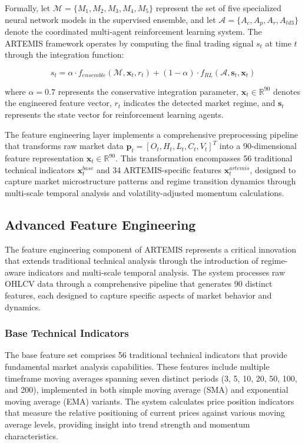 \documentclass[10pt,twocolumn]{article}
\begin{document}
Formally, let $\mathcal{M} = \{M_1, M_2, M_3, M_4, M_5\}$ represent the set of five specialized neural network models in the supervised ensemble, and let $\mathcal{A} = \{A_c, A_p, A_r, A_{td3}\}$ denote the coordinated multi-agent reinforcement learning system. The ARTEMIS framework operates by computing the final trading signal $s_t$ at time $t$ through the integration function:

\begin{equation}
s_t = \alpha \cdot f_{ensemble}(\mathcal{M}, \mathbf{x}_t, r_t) + (1-\alpha) \cdot f_{RL}(\mathcal{A}, \mathbf{s}_t, \mathbf{x}_t)
\end{equation}

where $\alpha = 0.7$ represents the conservative integration parameter, $\mathbf{x}_t \in \mathbb{R}^{90}$ denotes the engineered feature vector, $r_t$ indicates the detected market regime, and $\mathbf{s}_t$ represents the state vector for reinforcement learning agents.

The feature engineering layer implements a comprehensive preprocessing pipeline that transforms raw market data $\mathbf{p}_t = [O_t, H_t, L_t, C_t, V_t]^T$ into a 90-dimensional feature representation $\mathbf{x}_t \in \mathbb{R}^{90}$. This transformation encompasses 56 traditional technical indicators $\mathbf{x}^{base}_t$ and 34 ARTEMIS-specific features $\mathbf{x}^{artemis}_t$, designed to capture market microstructure patterns and regime transition dynamics through multi-scale temporal analysis and volatility-adjusted momentum calculations.

\subsection{Advanced Feature Engineering}

The feature engineering component of ARTEMIS represents a critical innovation that extends traditional technical analysis through the introduction of regime-aware indicators and multi-scale temporal analysis. The system processes raw OHLCV data through a comprehensive pipeline that generates 90 distinct features, each designed to capture specific aspects of market behavior and dynamics.

\subsubsection{Base Technical Indicators}

The base feature set comprises 56 traditional technical indicators that provide fundamental market analysis capabilities. These features include multiple timeframe moving averages spanning seven distinct periods (3, 5, 10, 20, 50, 100, and 200), implemented in both simple moving average (SMA) and exponential moving average (EMA) variants. The system calculates price position indicators that measure the relative positioning of current prices against various moving average levels, providing insight into trend strength and momentum characteristics.
\end{document}
